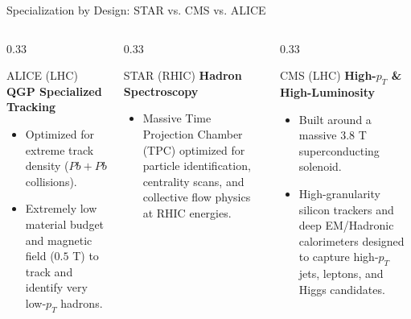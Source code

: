 \documentclass[aspectratio=169]{beamer}
\begin{document}
\begin{frame}{Specialization by Design: STAR vs. CMS vs. ALICE}
    \begin{columns}
        \begin{column}{0.33\textwidth}
            \begin{block}{ALICE (LHC)}
                \tiny
                \textbf{QGP Specialized Tracking}
                \begin{itemize}
                    \item Optimized for extreme track density ($Pb+Pb$ collisions).
                    \item Extremely low material budget and magnetic field ($0.5$ T) to track and identify very low-$p_T$ hadrons.
                \end{itemize}
            \end{block}
        \end{column}
        \begin{column}{0.33\textwidth}
            \begin{block}{STAR (RHIC)}
                \tiny
                \textbf{Hadron Spectroscopy}
                \begin{itemize}
                    \item Massive Time Projection Chamber (TPC) optimized for particle identification, centrality scans, and collective flow physics at RHIC energies.
                \end{itemize}
            \end{block}
        \end{column}
        \begin{column}{0.33\textwidth}
            \begin{block}{CMS (LHC)}
                \tiny
                \textbf{High-$p_T$ \& High-Luminosity}
                \begin{itemize}
                    \item Built around a massive $3.8$ T superconducting solenoid.
                    \item High-granularity silicon trackers and deep EM/Hadronic calorimeters designed to capture high-$p_T$ jets, leptons, and Higgs candidates.
                \end{itemize}
            \end{block}
        \end{column}
    \end{columns}
\end{frame}
\end{document}
